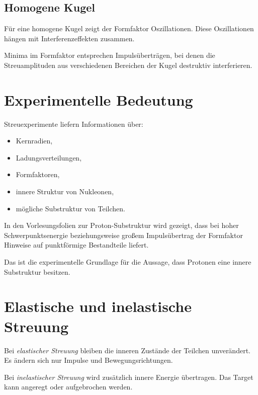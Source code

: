 \subsection{Homogene Kugel}

\begin{notebox}
Für eine homogene Kugel zeigt der Formfaktor Oszillationen.
Diese Oszillationen hängen mit Interferenzeffekten zusammen.

Minima im Formfaktor entsprechen Impulsüberträgen, bei denen die Streuamplituden
aus verschiedenen Bereichen der Kugel destruktiv interferieren.
\end{notebox}

\section{Experimentelle Bedeutung}

\begin{conceptbox}
Streuexperimente liefern Informationen über:
\begin{itemize}
    \item Kernradien,
    \item Ladungsverteilungen,
    \item Formfaktoren,
    \item innere Struktur von Nukleonen,
    \item mögliche Substruktur von Teilchen.
\end{itemize}
\end{conceptbox}

\begin{notebox}
In den Vorlesungsfolien zur Proton-Substruktur wird gezeigt, dass bei hoher
Schwerpunktsenergie beziehungsweise großem Impulsübertrag der Formfaktor Hinweise
auf punktförmige Bestandteile liefert.

Das ist die experimentelle Grundlage für die Aussage, dass Protonen eine innere
Substruktur besitzen.
\end{notebox}

\section{Elastische und inelastische Streuung}

\begin{definitionbox}
Bei \emph{elastischer Streuung} bleiben die inneren Zustände der Teilchen unverändert.
Es ändern sich nur Impulse und Bewegungsrichtungen.

Bei \emph{inelastischer Streuung} wird zusätzlich innere Energie übertragen.
Das Target kann angeregt oder aufgebrochen werden.
\end{definitionbox}


